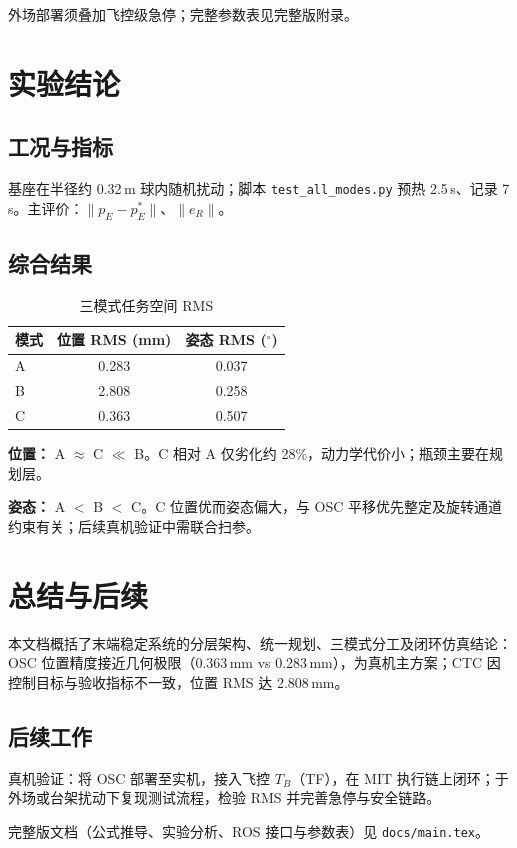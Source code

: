 \documentclass[UTF8, a4paper, 12pt]{ctexart}
\begin{document}
外场部署须叠加飞控级急停；完整参数表见完整版附录。

\section{实验结论}

\subsection{工况与指标}

基座在半径约 0.32\,m 球内随机扰动；脚本 \texttt{test\_all\_modes.py} 预热 2.5\,s、记录 7\,s。主评价：$\|p_E-p_E^*\|$、$\|e_R\|$。

\subsection{综合结果}

\begin{table}[H]
  \centering
  \caption{三模式任务空间 RMS}
  \renewcommand{\arraystretch}{1.2}
  \begin{tabular}{@{} l c c @{}}
    \toprule
    模式 & 位置 RMS (mm) & 姿态 RMS ($^\circ$) \\
    \midrule
    A & 0.283 & 0.037 \\
    B & 2.808 & 0.258 \\
    C & 0.363 & 0.507 \\
    \bottomrule
  \end{tabular}
\end{table}

\textbf{位置：} A $\approx$ C $\ll$ B。C 相对 A 仅劣化约 28\%，动力学代价小；瓶颈主要在规划层。

\textbf{姿态：} A $<$ B $<$ C。C 位置优而姿态偏大，与 OSC 平移优先整定及旋转通道约束有关；后续真机验证中需联合扫参。

\section{总结与后续}

本文档概括了末端稳定系统的分层架构、统一规划、三模式分工及闭环仿真结论：OSC 位置精度接近几何极限（0.363\,mm vs 0.283\,mm），为真机主方案；CTC 因控制目标与验收指标不一致，位置 RMS 达 2.808\,mm。

\subsection{后续工作}

真机验证：将 OSC 部署至实机，接入飞控 $T_B$（TF），在 MIT 执行链上闭环；于外场或台架扰动下复现测试流程，检验 RMS 并完善急停与安全链路。

完整版文档（公式推导、实验分析、ROS 接口与参数表）见 \texttt{docs/main.tex}。
\end{document}
